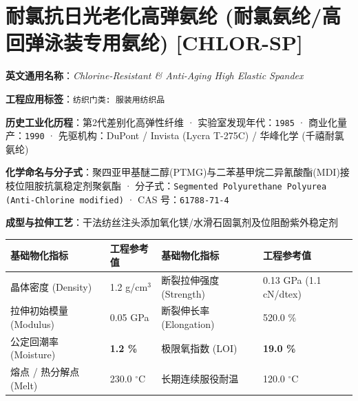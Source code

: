 \documentclass[11pt,openright,twoside,UTF8]{ctexbook}
\begin{document}
\section{耐氯抗日光老化高弹氨纶 (耐氯氨纶/高回弹泳装专用氨纶) [CHLOR-SP]}
\label{sec:chlor-sp}

\noindent\textbf{英文通用名称}：\textit{Chlorine-Resistant \& Anti-Aging High Elastic Spandex}\par
\noindent\textbf{工程应用标签}：\texttt{纺织门类: 服装用纺织品}\par
\noindent\textbf{历史工业化历程}：第2代差别化高弹性纤维 · 实验室发现年代：\texttt{1985} · 商业化量产：\texttt{1990} · 先驱机构：DuPont / Invista (Lycra T-275C) / 华峰化学 (千禧耐氯氨纶)\par
\noindent\textbf{化学命名与分子式}：聚四亚甲基醚二醇(PTMG)与二苯基甲烷二异氰酸酯(MDI)接枝位阻胺抗氯稳定剂聚氨酯 · 分子式：\texttt{Segmented Polyurethane Polyurea (Anti-Chlorine modified)} · CAS 号：\texttt{61788-71-4}\par
\noindent\textbf{成型与拉伸工艺}：干法纺丝注头添加氧化镁/水滑石固氯剂及位阻酚紫外稳定剂\par

\vspace{0.15cm}
\begin{center}
\small
\begin{tabularx}{\textwidth}{p{3.8cm}Xp{3.8cm}X}
\toprule
\textbf{基础物化指标} & \textbf{工程参考值} & \textbf{基础物化指标} & \textbf{工程参考值} \\
\midrule
晶体密度 (Density) & 1.2 g/cm$^3$ & 断裂拉伸强度 (Strength) & 0.13 GPa (1.1 cN/dtex) \\
拉伸初始模量 (Modulus) & 0.05 GPa & 断裂伸长率 (Elongation) & 520.0 \% \\
公定回潮率 (Moisture) & \textbf{1.2 \%} & 极限氧指数 (LOI) & \textbf{19.0 \%} \\
熔点 / 热分解点 (Melt) & 230.0 $^\circ\mathrm{C}$ & 长期连续服役耐温 & 120.0 $^\circ\mathrm{C}$ \\
\bottomrule
\end{tabularx}
\end{center}
\vspace{0.15cm}
\end{document}
